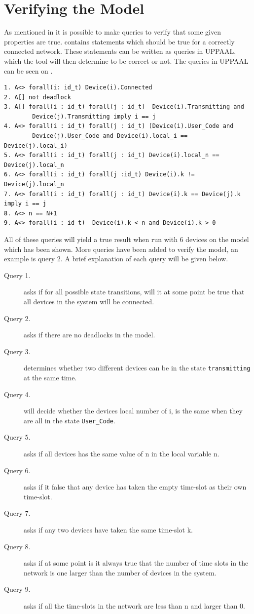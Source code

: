 \section{Verifying the Model}

As mentioned in  it is possible to make queries to verify that some given properties are true.
 contains statements which should be true for a correctly connected network.
These statements can be written as queries in UPPAAL, which the tool will then determine to be correct or not. 
The queries in UPPAAL can be seen on .

\begin{lstlisting}[language={[GUI]Uppaal}, % use GUI flavor
columns={[l]flexible},
frameround=fftt, frame=shadowbox, rulesepcolor=\color{gray},label=lst:UPPAAL_Queries,
caption={Queries for the UPPAAL Model}]
1. A<> forall(i: id_t) Device(i).Connected
2. A[] not deadlock
3. A[] forall(i : id_t) forall(j : id_t)  Device(i).Transmitting and 
		Device(j).Transmitting imply i == j
4. A<> forall(i : id_t) forall(j : id_t) (Device(i).User_Code and 
		Device(j).User_Code and Device(i).local_i == Device(j).local_i)
5. A<> forall(i : id_t) forall(j : id_t) Device(i).local_n == Device(j).local_n
6. A<> forall(i : id_t) forall(j :id_t) Device(i).k != Device(j).local_n
7. A<> forall(i : id_t) forall(j : id_t) Device(i).k == Device(j).k imply i == j
8. A<> n == N+1
9. A<> forall(i : id_t)  Device(i).k < n and Device(i).k > 0
\end{lstlisting}

All of these queries will yield a true result when run with 6 devices on the model which has been shown.
More queries have been added to verify the model, an example is query 2.
A brief explanation of each query will be given below. 

\begin{description}
	\item [Query 1.] asks if for all possible state transitions, will it at some point be true that all devices in the system will be connected.
	\item [Query 2.] asks if there are no deadlocks in the model.
	\item [Query 3.] determines whether two different devices can be in the state \texttt{transmitting} at the same time.
	\item [Query 4.] will decide whether the devices local number of i, is the same when they are all in the state \texttt{User\_Code}.
	\item [Query 5.] asks if all devices has the same value of n in the local variable n.
	\item [Query 6.] asks if it false that any device has taken the empty time-slot as their own time-slot.
	\item [Query 7.] asks if any two devices have taken the same time-slot k.
	\item [Query 8.] asks if at some point is it always true that the number of time slots in the network is one larger than the number of devices in the system.
	\item [Query 9.] asks if all the time-slots in the network are less than n and larger than 0.
\end{description}

